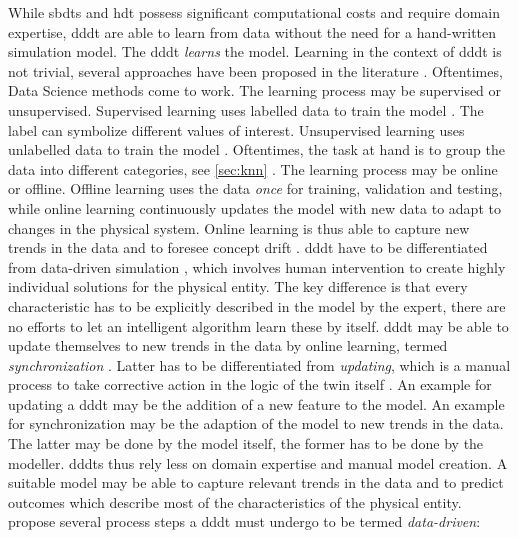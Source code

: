 While \gls{sbdt}s and \gls{hdt} possess significant computational costs and require domain expertise, \gls{dddt} are able to learn from data without the need for a hand-written simulation model. The \gls{dddt} \textit{learns} the model. Learning in the context of \gls{dddt} is not trivial, several approaches have been proposed in the literature \autocite{he2019data,Friederich2022,francis2021towards}. Oftentimes, Data Science methods come to work. The learning process may be supervised or unsupervised. Supervised learning uses labelled data to train the model \autocite{cunningham2008supervised}. The label can symbolize different values of interest. Unsupervised learning uses unlabelled data to train the model \autocite{barlow1989unsupervised}. Oftentimes, the task at hand is to group the data into different categories, see \autoref{sec:knn} \autocite{Biesinger2019}.
The learning process may be online or offline. Offline learning uses the data \textit{once} for training, validation and testing, while online learning continuously updates the model with new data to adapt to changes in the physical system. Online learning is thus able to capture new trends in the data and to foresee concept drift \autocite{tsymbal2004problem}. \gls{dddt} have to be differentiated from data-driven simulation \autocite{Charpentier2014}, which involves human intervention to create highly individual solutions for the physical entity. The key difference is that every characteristic has to be explicitly described in the model by the expert, there are no efforts to let an intelligent algorithm learn these by itself. \gls{dddt} may be able to update themselves to new trends in the data by online learning, termed \textit{synchronization} \autocite{reinhardt2019survey}. Latter has to be differentiated from \textit{updating}, which is a manual process to take corrective action in the logic of the twin itself \autocite{schwede2024learning}. An example for updating a \gls{dddt} may be the addition of a new feature to the model. An example for synchronization may be the adaption of the model to new trends in the data. The latter may be done by the model itself, the former has to be done by the modeller.
\gls{dddt}s thus rely less on domain expertise and manual model creation. A suitable model may be able to capture relevant trends in the data and to predict outcomes which describe most of the characteristics of the physical entity. \textcite{francis2021towards} propose several process steps a \gls{dddt} must undergo to be termed \textit{data-driven}:


